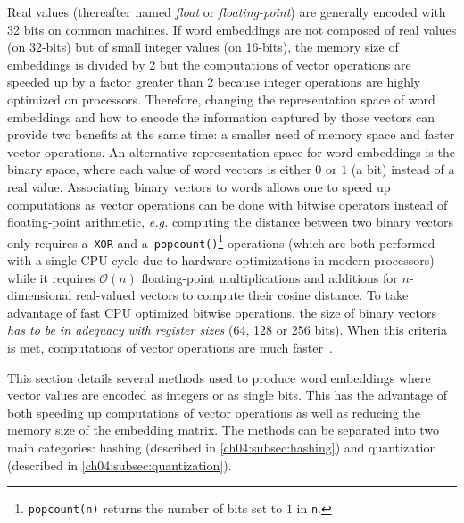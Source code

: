   Real values (thereafter named \textit{float} or \textit{floating-point}) are
  generally encoded with 32 bits on common machines. If word embeddings are not
  composed of real values (on 32-bits) but of small integer values (on 16-bits),
  the memory size of embeddings is divided by 2 but the computations of vector
  operations are speeded up by a factor greater than 2 because integer
  operations are highly optimized on processors. Therefore, changing the
  representation space of word embeddings and how to encode the information
  captured by those vectors can provide two benefits at the same time: a smaller
  need of memory space and faster vector operations. An alternative
  representation space for word embeddings is the binary space, where each value
  of word vectors is either $0$ or $1$ (a bit) instead of a real value.
  Associating binary vectors to words allows one to speed up computations as
  vector operations can be done with bitwise operators instead of floating-point
  arithmetic, \textit{e.g.} computing the distance between two binary vectors
  only requires a~\verb+XOR+ and
  a~\verb+popcount()+\footnote{\texttt{popcount(n)} returns the number of bits
  set to $1$ in \texttt{n}.} operations (which are both performed with a single
  CPU cycle due to hardware optimizations in modern processors) while it
  requires $\mathcal{O}(n)$ floating-point multiplications and additions for
  $n$-dimensional real-valued vectors to compute their cosine distance. To take
  advantage of fast CPU optimized bitwise operations, the size of binary vectors
  \emph{has to be in adequacy with register sizes} (64, 128 or 256 bits). When
  this criteria is met, computations of vector operations are much
  faster~\citep{norouzi2012fast,subercaze2015metric}. \medskip

  This section details several methods used to produce word embeddings where
  vector values are encoded as integers or as single bits. This has the
  advantage of both speeding up computations of vector operations as well as
  reducing the memory size of the embedding matrix. The methods can be separated
  into two main categories: hashing (described in \autoref{ch04:subsec:hashing})
  and quantization (described in \autoref{ch04:subsec:quantization}).

